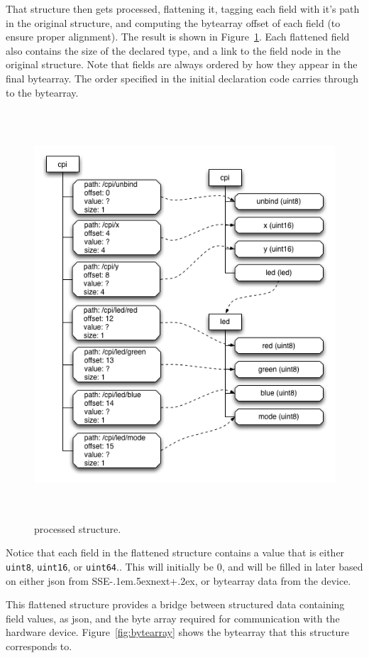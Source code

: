 \documentclass[12pt]{article}
\def\SSEnext{SSE\kern-.1em\lower.5ex\hbox{\footnotesize next}\kern+.2ex}
\def\SSEnext{SSE\kern-.1em\lower.5ex\hbox{\footnotesize next}\kern+.2ex}
\begin{document}
That structure then gets processed, flattening it, tagging each field
with it's path in the original structure, and computing the bytearray
offset of each field (to ensure proper alignment). The result is shown
in Figure~\ref{fig:flattened}. Each flattened field also contains the
size of the declared type, and a link to the field node in the
original structure. Note that fields are always ordered by how they
appear in the final bytearray. The order specified in the initial
declaration code carries through to the bytearray.

\begin{figure}[htbp] %
   \centering
   \includegraphics[height=6in]{flat_structure.png} 
\caption{processed structure.}
\label{fig:flattened}
\end{figure}

Notice that each field in the flattened structure contains a value
that is either \verb|uint8|, \verb|uint16|, or \verb|uint64|..
This will initially be 0, and will be filled in later based on either json
from \SSEnext, or bytearray data from the device.

This flattened structure provides a bridge between structured data
containing field values, as json, and the byte array required for
communication with the hardware device. Figure~\ref{fig:bytearray}
shows the bytearray that this structure corresponds to.
\end{document}
